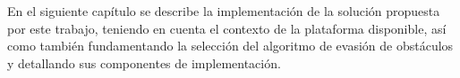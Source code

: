 
En el siguiente capítulo se describe la implementación de la solución propuesta por este trabajo, teniendo en cuenta el contexto de la plataforma disponible, así como también fundamentando la selección del algoritmo de evasión de obstáculos y detallando sus componentes de implementación.
    
   